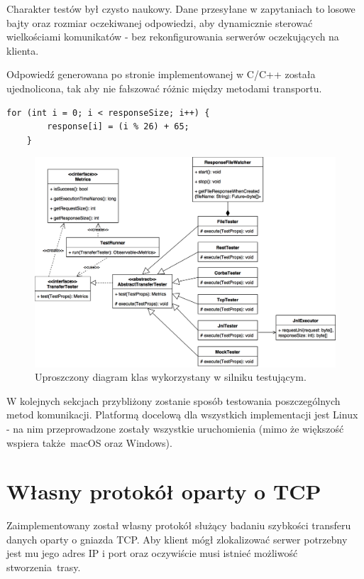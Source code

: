 Charakter testów był czysto naukowy. Dane przesyłane w zapytaniach to losowe bajty oraz rozmiar oczekiwanej odpowiedzi, aby dynamicznie sterować wielkościami komunikatów - bez rekonfigurowania serwerów oczekujących na klienta.

Odpowiedź generowana po stronie implementowanej w C/C++ została ujednolicona, tak aby nie fałszować różnic między metodami transportu.

\begin{lstlisting}[caption={Fragment kodu wykorzystywanego w każdej metodzie komunikacji do generowania odpowiedzi},captionpos=b]
    for (int i = 0; i < responseSize; i++) {
        response[i] = (i % 26) + 65;
    }
\end{lstlisting}

\begin{figure}[h!]
    \centering
    \includegraphics[width=\textwidth,height=\textheight,keepaspectratio]{img/class_diagram.png}
    \caption{Uproszczony diagram klas wykorzystany w silniku testującym.}
\end{figure}

W kolejnych sekcjach przybliżony zostanie sposób testowania poszczególnych metod komunikacji. Platformą docelową dla wszystkich implementacji jest Linux - na nim przeprowadzone zostały wszystkie uruchomienia (mimo że większość wspiera także macOS oraz Windows).

\section{Własny protokół oparty o TCP}

Zaimplementowany został własny protokół służący badaniu szybkości transferu danych oparty o gniazda TCP. Aby klient mógł zlokalizować serwer potrzebny jest mu jego adres IP i port oraz oczywiście musi istnieć możliwość stworzenia trasy.

